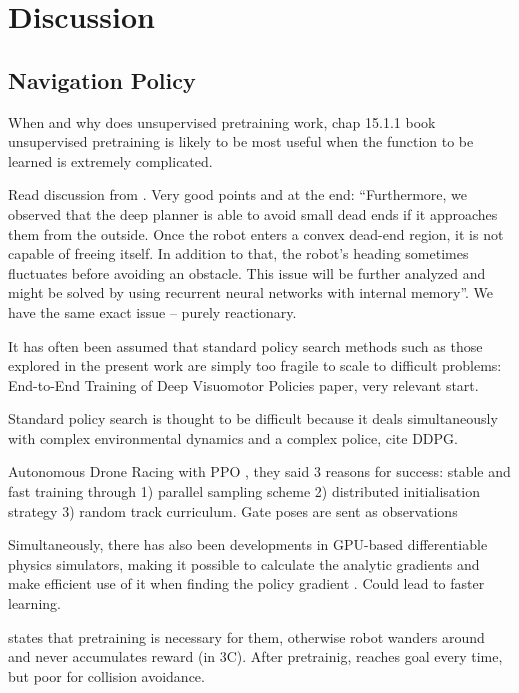 \chapter{Discussion}
\label{chap:9_discussion}

\section{Navigation Policy}
When and why does unsupervised pretraining work, chap 15.1.1 book
unsupervised pretraining is likely to be most useful when the function to be learned is extremely complicated. \cite{DeepLearningBook}

Read discussion from \cite{pfeiffer2017perception}. Very good points and at the end:
``Furthermore, we observed that the deep planner is able to avoid small dead ends if it approaches them from the outside. Once the robot enters a convex dead-end region, it is not capable of freeing itself. In addition to that, the robot’s heading sometimes fluctuates before avoiding an obstacle. This issue will be further analyzed and might be solved by using recurrent neural networks with internal memory''. We have the same exact issue -- purely reactionary.

It has often been assumed that standard policy search methods such as those explored in the present
work are simply too fragile to scale to difficult problems: End-to-End Training of Deep Visuomotor Policies paper, very relevant start.

Standard policy search is thought to be difficult because it deals simultaneously with complex environmental dynamics and a complex police, cite DDPG.

Autonomous Drone Racing with PPO \cite{song2021droneRacing}, they said 3 reasons for success: stable and fast training through 1) parallel sampling scheme 2) distributed initialisation strategy 3) random track curriculum. Gate poses are sent as observations

Simultaneously, there has also been developments in GPU-based differentiable physics simulators, making it possible to calculate the analytic gradients and make efficient use of it when finding the policy gradient \cite{oldDifferentiablePhysicsSimulator, differentiablePhysicsSimulator}. Could lead to faster learning. 

\cite{MotionPlanningAmongDynamicAgentsDRL2018} states that pretraining is necessary for them, otherwise robot wanders around and never accumulates reward (in 3C). After pretrainig, reaches goal every time, but poor for collision avoidance.

